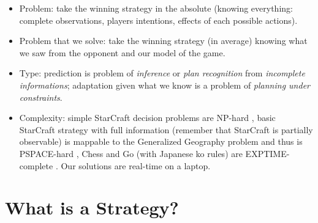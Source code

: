 \begin{itemize}
\item Problem: take the winning strategy in the absolute (knowing everything: complete observations, players intentions, effects of each possible actions).
\item Problem that we solve: take the winning strategy (in average) knowing what we saw from the opponent and our model of the game. 
\item Type: prediction is problem of \textit{inference} or \textit{plan recognition} from \textit{incomplete informations}; adaptation given what we know is a problem of \textit{planning under constraints}.
\item Complexity: simple StarCraft decision problems are NP-hard \citep{GamingComplexity}, basic StarCraft strategy with full information (remember that StarCraft is partially observable) is mappable to the Generalized Geography problem and thus is PSPACE-hard \citep{Lichtenstein78}, Chess \citep{Fraenkel81} and Go (with Japanese ko rules) are EXPTIME-complete \citep{Robson83}. Our solutions are real-time on a laptop. %
\end{itemize}

\section{What is a Strategy?}


